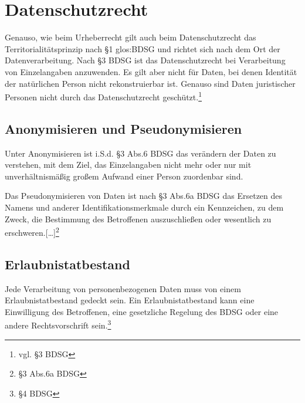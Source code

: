 \section{Datenschutzrecht}
Genauso, wie beim Urheberrecht gilt auch beim Datenschutzrecht das Territorialit\"atsprinzip nach §1 \gls{glos:BDSG} und richtet sich nach dem Ort der Datenverarbeitung. Nach §3 BDSG ist das Datenschutzrecht bei Verarbeitung von Einzelangaben anzuwenden. Es gilt aber nicht f\"ur Daten, bei denen Identit\"at der nat\"urlichen Person nicht rekonstruierbar ist. Genauso sind Daten juristischer Personen nicht durch das Datenschutzrecht gesch\"utzt.\footnote{vgl. §3 BDSG} 

\subsection{Anonymisieren und Pseudonymisieren}
Unter Anonymisieren ist i.S.d. §3 Abs.6 BDSG das ver\"andern der Daten zu verstehen, mit dem Ziel, das Einzelangaben nicht mehr oder nur mit unverh\"altnism\"a{\ss}ig gro{\ss}em Aufwand einer Person zuordenbar sind.\newline

Das Pseudonymisieren von Daten ist nach §3 Abs.6a BDSG {\glqq}das Ersetzen des Namens und anderer Identifikationsmerkmale durch ein Kennzeichen, zu dem Zweck, die Bestimmung des Betroffenen auszuschlie{\ss}en oder wesentlich zu erschweren.[…]{\grqq}\footnote{§3 Abs.6a BDSG} 
 \label{pseudonymisieren}
\subsection{Erlaubnistatbestand}
Jede Verarbeitung von personenbezogenen Daten muss von einem Erlaubnistatbestand gedeckt sein. Ein Erlaubnistatbestand kann eine Einwilligung des Betroffenen, eine gesetzliche Regelung des BDSG oder eine andere Rechtsvorschrift sein.\footnote{§4 BDSG}
 \label{erlaubnistatbestand}

